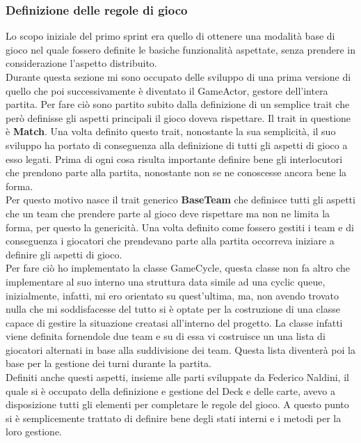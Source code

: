 	\subsubsection{Definizione delle regole di gioco}
	  Lo scopo iniziale del primo sprint era quello di ottenere una modalità base di gioco nel quale fossero definite le basiche funzionalità aspettate, senza prendere in considerazione l'aspetto distribuito.
	  \\
	  Durante questa sezione mi sono occupato delle sviluppo di una prima versione di quello che poi successivamente è diventato il GameActor, gestore dell'intera partita. 
	  Per fare ciò sono partito subito dalla definizione di un semplice trait che però definisse gli aspetti principali il gioco doveva rispettare. 
	  Il trait in questione è \textbf{Match}. Una volta definito questo trait, nonostante la sua semplicità, il suo sviluppo ha portato di conseguenza alla definizione di tutti gli aspetti di gioco a esso legati. 
	  Prima di ogni cosa risulta importante definire bene gli interlocutori che prendono parte alla partita, nonostante non se ne conoscesse ancora bene la forma. \\
	  Per questo motivo nasce il trait generico \textbf{BaseTeam} che definisce tutti gli aspetti che un team che prendere parte al gioco deve rispettare ma non ne limita la forma, per questo la genericità.
	  Una volta definito come fossero gestiti i team e di conseguenza i giocatori che prendevano parte alla partita occorreva iniziare a definire gli aspetti di gioco.\\
	  Per fare ciò ho implementato la classe GameCycle, questa classe non fa altro che implementare al suo interno una struttura data simile ad una cyclic queue, inizialmente, infatti, mi ero orientato su quest'ultima, ma, non avendo trovato nulla che mi soddisfacesse del tutto si è optate per la costruzione di una classe capace di gestire la situazione creatasi all'interno del progetto. 
	  La classe infatti viene definita fornendole due team e su di essa vi costruisce un una lista di giocatori alternati in base alla suddivisione dei team. Questa lista diventerà poi la base per la gestione dei turni durante la partita. 
	  \\
	  Definiti anche questi aspetti, insieme alle parti sviluppate da Federico Naldini, il quale si è occupato della definizione e gestione del Deck e delle carte, avevo a disposizione tutti gli elementi per completare le regole del gioco. 
	  A questo punto si è semplicemente trattato di definire bene degli stati interni e i metodi per la loro gestione. 
	  \\

